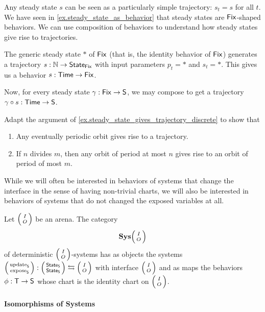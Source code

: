 \documentclass[DynamicalBook]{subfiles}
\begin{document}
\begin{example}\label{ex.steady_state_gives_trajectory_discrete}
  Any steady state $s$ can be seen as a particularly simple trajectory: $s_t =
  s$ for all $t$. We have seen in
  \cref{ex.steady_state_as_behavior}
  that steady states are $\mathsf{Fix}$-shaped behaviors. We can use composition of behaviors to
  understand how steady states give rise to trajectories.

  The generic steady state $\ast$ of $\mathsf{Fix}$ (that is, the identity behavior of
  $\mathsf{Fix}$) generates a trajectory $s : \mathbb{N} \to \mathsf{State}_{\mathsf{Fix}}$ with input
  parameters $p_t = \ast$ and $s_t = \ast$. This gives us a behavior $s :
  \mathsf{Time} \to \mathsf{Fix}$.
  
  Now, for every steady state $\gamma : \mathsf{Fix} \to \mathsf{S}$, we may compose
  to get a trajectory $\gamma \circ s : \mathsf{Time} \to \mathsf{S}$.
\end{example}

\begin{exercise}\label{ex.behaviors_as_change_of_kind_discrete}
Adapt the argument of \cref{ex.steady_state_gives_trajectory_discrete} to show
that
\begin{enumerate}
  \item Any eventually periodic orbit gives rise to a trajectory.
  \item If $n$ divides $m$, then any orbit of period at most $n$ gives rise to
    an orbit of period of most $m$.
\qedhere
\end{enumerate}
\end{exercise}

While we will often be interested in behaviors of systems that change the
interface in the sense of having non-trivial charts, we will also be interested
in behaviors of systems that do not changed the exposed variables at all.

\begin{definition}\label{def.cat_of_systems_discrete}
  Let $\lens{I}{O}$ be an arena. The category
$$\Cat{Sys}\lens{I}{O}$$
of deterministic $\lens{I}{O}$-systems has as objects the systems
$\lens{\update{S}}{\expose{S}} : \lens{\State{S}}{\State{S}} \fromto
\lens{I}{O}$ with interface $\lens{I}{O}$ and as maps the behaviors $\phi :
\mathsf{T} \to \mathsf{S}$ whose chart is the identity chart on $\lens{I}{O}$.
\end{definition}

\paragraph{Isomorphisms of Systems}
\end{document}

